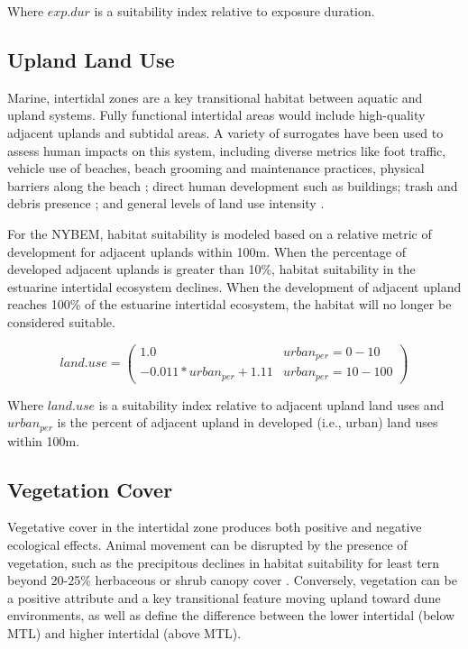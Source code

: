 \documentclass[
]{book}
\begin{document}
Where \(exp.dur\) is a suitability index relative to exposure duration.

\hypertarget{upland-land-use}{%
\subsection{Upland Land Use}\label{upland-land-use}}

Marine, intertidal zones are a key transitional habitat between aquatic and upland systems. Fully functional intertidal areas would include high-quality adjacent uplands and subtidal areas. A variety of surrogates have been used to assess human impacts on this system, including diverse metrics like foot traffic, vehicle use of beaches, beach grooming and maintenance practices, physical barriers along the beach \citep{farmer_habitat_2000}; direct human development such as buildings; trash and debris presence \citep{usace_evaluation_2009}; and general levels of land use intensity \citep{seavey_effect_2011}.

For the NYBEM, habitat suitability is modeled based on a relative metric of development for adjacent uplands within 100m. When the percentage of developed adjacent uplands is greater than 10\%, habitat suitability in the estuarine intertidal ecosystem declines. When the development of adjacent upland reaches 100\% of the estuarine intertidal ecosystem, the habitat will no longer be considered suitable.

\[land.use = \begin{pmatrix} 1.0 & urban_{per}=0-10\\
-0.011*urban_{per}+1.11 & urban_{per}=10-100
\end{pmatrix}\]

Where \(land.use\) is a suitability index relative to adjacent upland land uses and \(urban_{per}\) is the percent of adjacent upland in developed (i.e., urban) land uses within 100m.

\hypertarget{vegetation-cover-2}{%
\subsection{Vegetation Cover}\label{vegetation-cover-2}}

Vegetative cover in the intertidal zone produces both positive and negative ecological effects. Animal movement can be disrupted by the presence of vegetation, such as the precipitous declines in habitat suitability for least tern beyond 20-25\% herbaceous or shrub canopy cover \citep{carreker_habitat_1985}. Conversely, vegetation can be a positive attribute and a key transitional feature moving upland toward dune environments, as well as define the difference between the lower intertidal (below MTL) and higher intertidal (above MTL)\citep{usace_evaluation_2009}.
\end{document}
